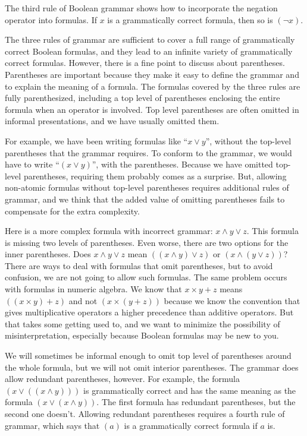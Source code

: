The third rule of Boolean grammar shows
how to incorporate the negation operator into formulas.
If $x$ is a grammatically correct formula, then so is $(\neg x)$.

The three rules of grammar are sufficient to
cover a full range of grammatically correct Boolean formulas,
and they lead to an infinite variety of grammatically correct formulas.
However, there is a fine point to discuss about parentheses.
Parentheses are important because they make it easy to define
the grammar and to explain the meaning of a formula.
The formulas covered by the three rules are fully parenthesized,
including a top level of parentheses enclosing the entire formula
when an operator is involved.
Top level parentheses are often omitted in informal presentations,
and we have usually omitted them.

For example, we have been writing formulas like ``$x \vee y$'',
without the top-level parentheses
that the grammar requires.
To conform to the grammar,
we would have to write ``$(x \vee y)$'', with the parentheses.
Because we have omitted top-level parentheses,
requiring them probably comes as a surprise.
But, allowing non-atomic formulas without top-level parentheses
requires additional rules of grammar,
and we think that the added value of omitting parentheses
fails to compensate for the extra complexity.

Here is a more complex formula with incorrect grammar:
$x \wedge y \vee z$. This formula is missing two levels of parentheses.
Even worse, there are two options for the inner parentheses.
Does $x \wedge y \vee z$ mean $((x \wedge y) \vee z)$ or $(x \wedge (y \vee z))$?
There are ways to deal with formulas that omit parentheses,
but to avoid confusion, we are not going to allow such formulas.
The same problem occurs with formulas in numeric algebra.
We know that $x \times y + z$ means $((x \times y) + z)$ and
not $(x \times (y + z))$ because we know the convention that
gives multiplicative operators a higher precedence than additive operators.
But that takes some getting used to, and we want to
minimize the possibility of misinterpretation,
especially because Boolean formulas may be new to you.

We will sometimes be informal enough to omit
top level of parentheses around the whole formula,
but we will not omit interior parentheses.
The grammar does allow redundant parentheses, however.
For example, the formula $(x \vee ((x \wedge y)))$
is grammatically correct and has the same meaning as the formula
$(x \vee (x \wedge y))$.
The first formula has redundant parentheses,
but the second one doesn't.
Allowing redundant parentheses requires a fourth rule of grammar,
which says that $(a)$ is a grammatically correct formula
if $a$ is.


